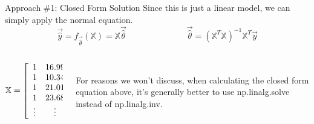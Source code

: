 \documentclass[aspectratio=169]{../latex_main/tntbeamer}  %
\begin{document}
	
	\begin{frame}{Approach \#1: Closed Form Solution}
	    Since this is just a linear model, we can simply apply the normal equation.
	    \begin{equation*}
	        \Vec{\hat{y}} = f_{\Vec{\hat{\theta}}}(\mathbb{X}) = \mathbb{X}\Vec{\hat{\theta}}
	        \hspace{3cm} \Vec{\hat{\theta}} = (\mathbb{X}^T\mathbb{X})^{-1}\mathbb{X}^T\Vec{y}
	    \end{equation*}
	    
	    \begin{columns}
            \begin{column}{.5\textwidth}
                    \begin{equation*}
                        \mathbb{X} = \left[\begin{array}{cc}
	                                 1 & 16.99 \\
	                                 1 & 10.34 \\
	                                 1 & 21.01 \\
	                                 1 & 23.68 \\
	                                 \vdots & \vdots
	                        \end{array}\right] \hspace{.5cm} \Vec{y} = \left[\begin{array}{c}
	                             1.01  \\
	                             1.66  \\
	                             3.50  \\
	                             3.31  \\
	                             \vdots
	                        \end{array}\right]
                    \end{equation*}
            \end{column}
            
            
            \begin{column}{.5\textwidth}
                    \vspace{.5cm}\\
                    For reasons we won’t discuss, when calculating the closed form equation above, it’s generally better to use np.linalg.solve instead of np.linalg.inv.
            \end{column}
	    \end{columns}
	\end{frame}
	
\end{document}
